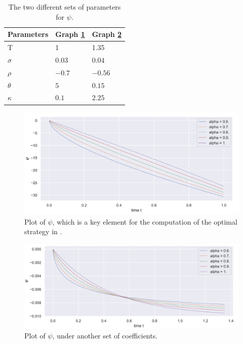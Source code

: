 \begin{table}
\begin{center}
\begin{tabular}{   m{4.5 cm} | m{4.5 cm} | m{4.5 cm}   } 
\hline
 Parameters & Graph \ref{fig:1A} & Graph \ref{fig:1B} \\ 
\hline
\hline
T & 1 & 1.35 \\
\hline
$\sigma$ & $0.03$ & $0.04$ \\
\hline
$\rho$ &$ -0.7$ &  $-0.56$\\
\hline
$\theta$  &  $5$ &$ 0.15$ \\
\hline
$\kappa$ & $0.1$ & $2.25$ \\
\hline
\end{tabular}
\caption{The two different sets of parameters for $\psi$.}
\label{tab:coef1}
\end{center}
\end{table}


\begin{figure}
\centering
\includegraphics[width = 0.7 \textwidth]{../addition_part/images/numerical_studies/1a.png}
\caption{Plot of $\psi$, which is a key element for the computation of the optimal strategy in \cite{HanWong}. }
\label{fig:1A}
\end{figure}



\begin{figure}
\centering
\includegraphics[width = 0.7 \textwidth]{../addition_part/images/numerical_studies/1b.png}
\caption{Plot of $\psi$, under another set of coefficients. }
\label{fig:1B}
\end{figure}









